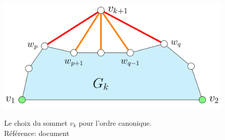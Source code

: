 \documentclass[10pt]{beamer}
\begin{document}
{\begin{frame}{}
\begin{columns}
\begin{column}{0.45\textwidth}  %
	\begin{figure}
		\centering
		\includegraphics[height=0.27\textheight]{oc0.png}\\[-.2cm]
\caption[caption]{Le choix du sommet $v_k$ pour l'ordre canonique. \\\vspace*{0.1cm} Référence: document \citeauthor{PhilippKindermann}}	
	\end{figure}
\end{column}
\end{columns}	
\end{frame}
}
\end{document}

